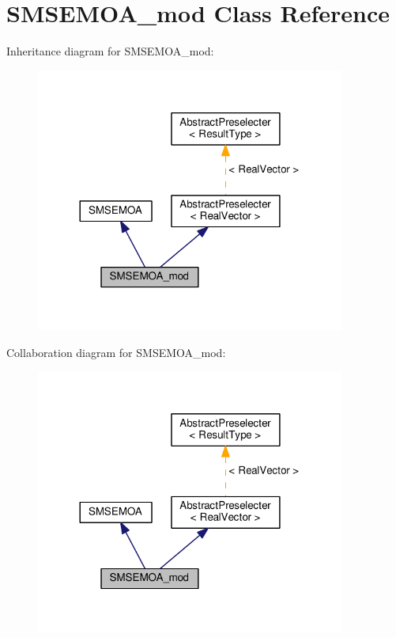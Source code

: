 \hypertarget{classSMSEMOA__mod}{}\section{S\+M\+S\+E\+M\+O\+A\+\_\+mod Class Reference}
\label{classSMSEMOA__mod}


Inheritance diagram for S\+M\+S\+E\+M\+O\+A\+\_\+mod\+:\nopagebreak
\begin{figure}[H]
\begin{center}
\leavevmode
\includegraphics[width=288pt]{classSMSEMOA__mod__inherit__graph}
\end{center}
\end{figure}


Collaboration diagram for S\+M\+S\+E\+M\+O\+A\+\_\+mod\+:\nopagebreak
\begin{figure}[H]
\begin{center}
\leavevmode
\includegraphics[width=288pt]{classSMSEMOA__mod__coll__graph}
\end{center}
\end{figure}
